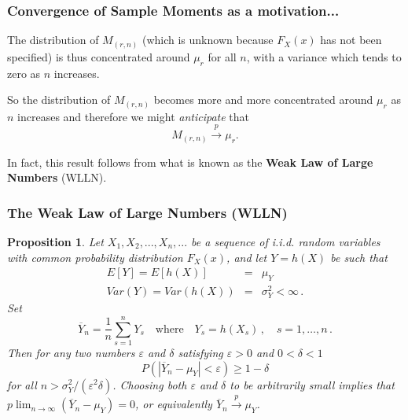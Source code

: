 \documentclass[notes=show,smaller,handout]{beamer}
\newtheorem{proposition}{Proposition}[section]
\renewcommand{\Pr}{P}
\begin{document}
\begin{frame}%

\frametitle{Convergence of Sample Moments as a motivation...}

The distribution of $M_{(r,n)}$ (which is unknown because $F_X(x)$ has not been specified) is thus concentrated around $\mu_r $ for all $n$, 
with a variance which tends to zero as $n$ increases. \\ \vspace{0.4cm}

So the distribution of $M_{(r,n)}$ becomes more and more concentrated around $\mu_r$ as $n
$ increases and therefore we might \color{blue}\emph{anticipate }\color{black} that
\begin{equation*}
M_{(r,n)}\overset{p}{\rightarrow }\mu_r.
\end{equation*}

\vspace{0.3cm} 
In fact, this result follows from what is known as the \textbf{Weak Law of Large Numbers} (WLLN).
\end{frame}%

\begin{frame}%

\frametitle{The Weak Law of Large Numbers (WLLN)}

\begin{proposition}
 Let $X_{1},X_{2},...,X_{n},...$ be a sequence of \textit{i.i.d.} random variables with common probability distribution $F_X(x)$, and let $Y=h(X)$ be such that
\begin{eqnarray*}
E[Y]=E\left[ h(X)\right]  &=&\mu_Y  \\
Var(Y)=Var\left( h(X)\right)  &=&\sigma_Y ^{2}<\infty\,.
\end{eqnarray*}%
Set
$$
\overline{Y}_n=\frac{1}{n}\sum_{s=1}^nY_s\quad\text{where}\quad Y_s=h(X_s)\,,\quad s=1,\ldots,n\,.
$$
Then for any two numbers $\varepsilon$ and $\delta$ satisfying $\varepsilon>0$ and $0<\delta<1$
$$
\Pr \left( \left\vert \overline{Y}_{n}-\mu_Y \right\vert<\varepsilon \right)\geq 1-\delta
$$
for all $n>\sigma_Y^2/(\varepsilon^2\delta)$. Choosing both $\varepsilon$ and $\delta$ to be arbitrarily small implies that $p\lim_{n\rightarrow\infty}(\overline{Y}_{n}-\mu_Y)=0$, or equivalently
$\overline{Y}_{n}\overset{p}{\rightarrow }\mu_Y$.
\end{proposition}

\end{frame}%
\end{document}
